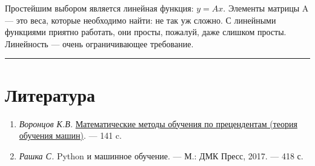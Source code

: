 \documentclass[11pt,a4paper]{article}
\renewcommand{\linethickness}{0.1ex}
\providecommand{\tightlist}{%
      \setlength{\itemsep}{0pt}\setlength{\parskip}{0pt}}
\begin{document}
    Простейшим выбором является линейная функция: \(y = Ax\). Элементы
матрицы A --- это веса, которые необходимо найти: не так уж сложно. С
линейными функциями приятно работать, они просты, пожалуй, даже слишком
просты. Линейность --- очень ограничивающее требование.

    \begin{center}\rule{0.5\linewidth}{\linethickness}\end{center}

    \hypertarget{ux43bux438ux442ux435ux440ux430ux442ux443ux440ux430}{%
\section{Литература}\label{ux43bux438ux442ux435ux440ux430ux442ux443ux440ux430}}

\begin{enumerate}
\def\labelenumi{\arabic{enumi}.}
\tightlist
\item
  \emph{Воронцов К.В.}
  \href{http://www.machinelearning.ru/wiki/images/6/6d/Voron-ML-1.pdf}{Математические
  методы обучения по прецендентам (теория обучения машин)}. --- 141 c.
\item
  \emph{Рашка С.} Python и машинное обучение. --- М.: ДМК Пресс, 2017.
  --- 418 с.
\end{enumerate}



    
    
    
\end{document}
